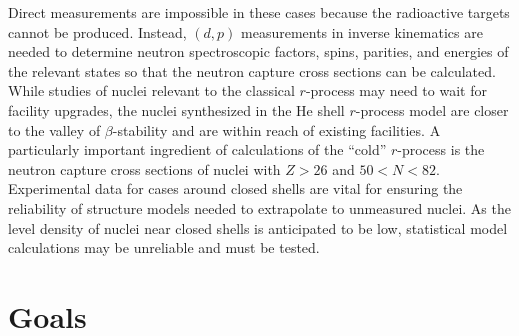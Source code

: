 {Direct measurements are impossible in these cases because  the radioactive targets cannot be produced. Instead, $(d,p)$ measurements in inverse kinematics are needed to determine neutron spectroscopic factors, spins, parities, and energies of the relevant states so that the neutron capture cross sections can be calculated.
While studies of nuclei relevant to the classical $r$-process may need to wait for facility upgrades, the nuclei synthesized in the He shell $r$-process model %
are closer to the valley of $\beta$-stability %
and are %
within reach %
of existing facilities.
A particularly important ingredient of calculations of the ``cold'' $r$-process %
is
the neutron capture cross sections of nuclei with $Z>26$ and $50<N<82$. Experimental data for cases around closed shells are vital for ensuring the reliability of structure models needed to extrapolate to unmeasured nuclei. As the level density of nuclei near closed shells is anticipated to be low, statistical model calculations may be unreliable and must be tested. %

\rhead{\desctext{\statename}}

\section*{Goals}


}
